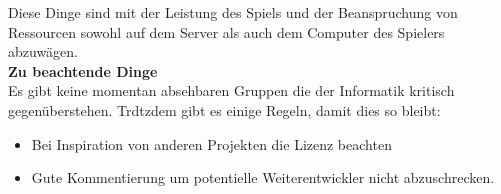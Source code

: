 \documentclass[11pt,a4paper]{article}
\begin{document}
Diese Dinge sind mit der Leistung des Spiels und der Beanspruchung von Ressourcen sowohl auf dem Server als auch dem Computer des Spielers abzuwägen.
\bigskip \\
{\large \bf Zu beachtende Dinge}
\smallskip \\
Es gibt keine momentan absehbaren Gruppen die der Informatik kritisch gegenüberstehen. Trdtzdem gibt es einige Regeln, damit dies so bleibt:
\begin{itemize}
\item Bei Inspiration von anderen Projekten die Lizenz beachten
\item Gute Kommentierung um potentielle Weiterentwickler nicht abzuschrecken.
\end{itemize}
\end{document}
